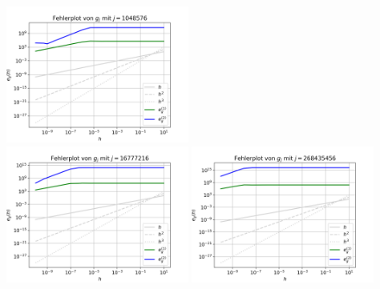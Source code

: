 \documentclass{scrartcl}
\begin{document}
{    \includegraphics[width=0.45\textwidth]{Grafiken/Fehlerplot_j1048576}\\
    \includegraphics[width=0.45\textwidth]{Grafiken/Fehlerplot_j16777216}
    \includegraphics[width=0.45\textwidth]{Grafiken/Fehlerplot_j268435456}\\
    \vspace{-0.2cm}

    \vspace{0.5cm}

}
\end{document}
